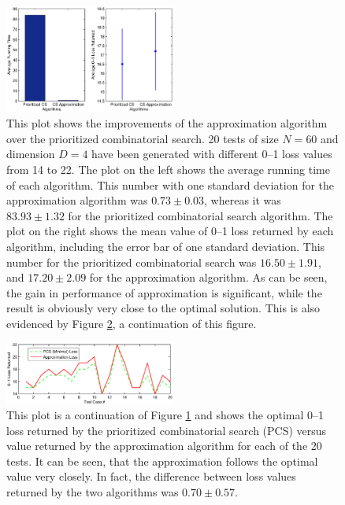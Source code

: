 \begin{figure}[here]
\includegraphics[width=0.50\textwidth]{images/fig43_approx.eps}
\caption{
This plot shows the improvements of the approximation algorithm over the prioritized combinatorial search. 20 tests of size $N=60$ and dimension $D=4$ have been generated with different 0--1 loss values from 14 to 22. The plot on the left shows the average running time of each algorithm. This number with one standard deviation for the approximation algorithm was $0.73 \pm 0.03$, whereas it was $83.93 \pm 1.32$ for the prioritized combinatorial search algorithm. The plot on the right shows the mean value of 0--1 loss returned by each algorithm, including the error bar of one standard deviation. This number for the prioritized combinatorial search was $16.50\pm 1.91$, and $17.20 \pm 2.09$ for the approximation algorithm. As can be seen, the gain in performance of approximation is significant, while the result is obviously very close to the optimal solution. This is also evidenced by Figure \ref{fig:cs_approxlosses}, a continuation of this figure. 
}
\label{fig:cs_approx}
\end{figure}

\begin{figure}[here]
\includegraphics[width=0.50\textwidth]{images/fig44_approxlosses.eps}
\caption{
This plot is a continuation of Figure \ref{fig:cs_approx} and shows  the optimal 0--1 loss returned by the prioritized combinatorial search (PCS) versus value returned by the approximation algorithm for each of the 20 tests. It can be seen, that the approximation follows the optimal value very closely. In fact, the difference between loss values returned by the two algorithms was $0.70 \pm 0.57$. 
}
\label{fig:cs_approxlosses}
\end{figure}

